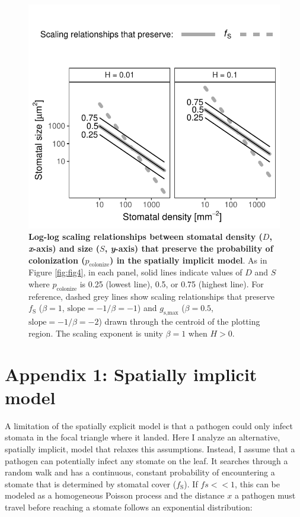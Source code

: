 \documentclass[utf8]{frontiersSCNS}
\newcommand{\fs}{$f_\text{S}$}
\newcommand{\gsmax}{$g_\text{s,max}$}
\begin{document}
\begin{figure}
  \centering
    \includegraphics{../figures/figS3.pdf}
    \caption{\textbf{Log-log scaling relationships between stomatal density ($D$, \textit{x}-axis) and size ($S$, \textit{y}-axis) that preserve the probability of colonization ($p_\text{colonize}$) in the spatially implicit model}. As in Figure \ref{fig:fig4}, in each panel, solid lines indicate values of $D$ and $S$ where $p_\text{colonize}$ is 0.25 (lowest line), 0.5, or 0.75 (highest line). For reference, dashed grey lines show scaling relationships that preserve \fs{} ($\beta = 1$, $\text{slope} = - 1 / \beta = -1$) and \gsmax{} ($\beta = 0.5$, $\text{slope} = - 1 / \beta = -2$) drawn through the centroid of the plotting region. The scaling exponent is unity $\beta = 1$ when $H > 0$.}
    \label{fig:figS3}
\end{figure}

\clearpage

\hypertarget{appendix-1-spatially-implicit-model}{%
\section*{Appendix 1: Spatially implicit
model}\label{appendix-1-spatially-implicit-model}}

A limitation of the spatially explicit model is that a pathogen could
only infect stomata in the focal triangle where it landed. Here I
analyze an alternative, spatially implicit, model that relaxes this
assumptions. Instead, I assume that a pathogen can potentially infect
any stomate on the leaf. It searches through a random walk and has a
continuous, constant probability of encountering a stomate that is
determined by stomatal cover (\fs). If \(fs << 1\), this can be modeled
as a homogeneous Poisson process and the distance \(x\) a pathogen must
travel before reaching a stomate follows an exponential distribution:
\end{document}
